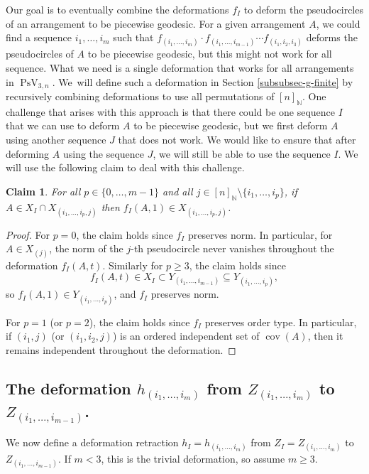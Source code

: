 \documentclass[11pt]{article}
\numberwithin{equation}{section}
\newtheorem{claim}[theorem]{Claim}
\theoremstyle{remark}
\let\mb\mathbb
\DeclareMathOperator{\pstief}{PsV}
\DeclareMathOperator{\cov}{cov}
\begin{document}
Our goal is to eventually combine the deformations $f_I$ to deform the pseudocircles of an arrangement to be piecewise geodesic. For a given arrangement $A$, we could find a sequence $i_1,\dots,i_m$ such that $f_{(i_1,\dots,i_m)}\cdot f_{(i_1,\dots,i_{m-1})}\cdots f_{(i_1,i_2,i_3)}$ deforms the pseudocircles of $A$ to be piecewise geodesic, but this might not work for all sequence.
What we need is a single deformation that works for all arrangements in $\pstief_{3,n}$. We~will define such a deformation in Section \ref{subsubsec-g-finite} by recursively combining deformations to use all permutations of $[n]_\mb{N}$. One challenge that arises with this approach is that there could be one sequence $I$ that we can use to deform $A$ to be piecewise geodesic, but we first deform $A$ using another sequence $J$ that does not work. We would like to ensure that after deforming $A$ using the sequence $J$, we will still be able to use the sequence $I$. We will use the following claim to deal with this challenge.

\begin{claim}\label{claim-stable-f}
For all $p \in \{0,\dots,m{-}1\}$ and all $j \in [n]_\mb{N} \setminus \{i_1,\dots,i_p\}$,
if $A \in X_I \cap X_{(i_1,\dots,i_{p},j)}$ then $f_I(A,1) \in X_{(i_1,\dots,i_{p},j)}$.
\end{claim}

\begin{proof}
For $p=0$, the claim holds since $f_I$ preserves norm. In particular, for \hbox{$A \in X_{(j)}$}, the norm of the $j$-th pseudocircle never vanishes throughout the deformation $f_I(A,t)$.
Similarly for $p\geq 3$, the claim holds since
\[
f_I(A,t) \in X_I \subset Y_{(i_1,\dots,i_{m-1})} \subseteq Y_{(i_1,\dots,i_p)},
\]
so $f_I(A,1) \in Y_{(i_1,\dots,i_p)}$, and $f_I$ preserves norm.

For $p=1$ (or $p=2$), the claim holds since $f_I$ preserves order type. In particular, if $(i_1,j)$ (or $(i_1,i_2,j)$) is an ordered independent set of $\cov(A)$, then it remains independent throughout the deformation.
\end{proof}

\subsection{The deformation $h_{(i_1,\dots,i_m)}$ from $Z_{(i_1,\dots,i_m)}$ to $Z_{(i_1,\dots,i_{m-1})}$.}
\label{subsubsec-h}

We now define a deformation retraction $h_I = h_{(i_1,\dots,i_m)}$ from $Z_I = Z_{(i_1,\dots,i_m)}$ to $Z_{(i_1,\dots,i_{m-1})}$. If $m < 3$, this is the trivial deformation, so assume $m \geq 3$.
\end{document}
